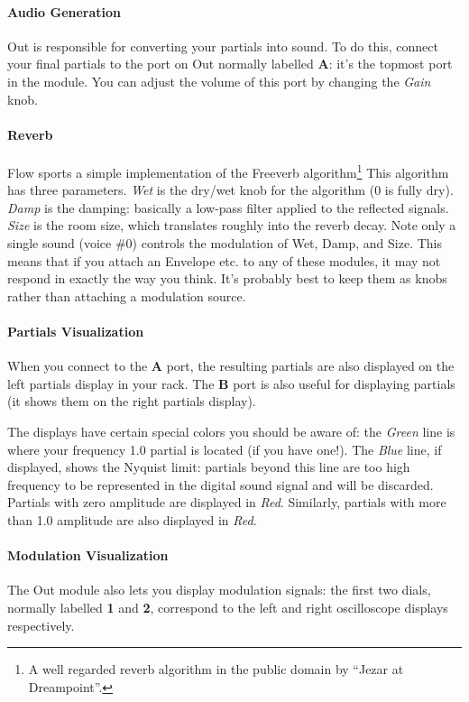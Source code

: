 \documentclass{article}
\begin{document}
\paragraph{Audio Generation}  Out is responsible for converting your partials into sound.  To do this, connect your final partials to the port on Out normally labelled {\bf A}: it's the topmost port in the module.  You can adjust the volume of this port by changing the {\it Gain} knob.

\paragraph{Reverb} Flow sports a simple implementation of the Freeverb algorithm\footnote{A well regarded reverb algorithm in the public domain by ``Jezar at Dreampoint''.}  This algorithm has three parameters.  {\it Wet} is the dry/wet knob for the algorithm (0 is fully dry).  {\it Damp} is the damping: basically a low-pass filter applied to the reflected signals.  {\it Size} is the room size, which translates roughly into the reverb decay.  Note only a single sound (voice \#0) controls the modulation of Wet, Damp, and Size.  This means that if you attach an Envelope etc. to any of these modules, it may not respond in exactly the way you think.  It's probably best to keep them as knobs rather than attaching a modulation source.

\paragraph{Partials Visualization}  When you connect to the {\bf A} port, the resulting partials are also displayed on the left partials display in your rack.  The {\bf B} port is also useful for displaying partials (it shows them on the right partials display).  

The displays have certain special colors you should be aware of: the {\it Green} line is where your frequency 1.0 partial is located (if you have one!).  The {\it Blue} line, if displayed, shows the Nyquist limit: partials beyond this line are too high frequency to be represented in the digital sound signal and will be discarded.  Partials with zero amplitude are displayed in {\it Red}.  Similarly, partials with more than 1.0 amplitude are also displayed in {\it Red}.

\paragraph{Modulation Visualization} The Out module also lets you display modulation signals: the first two dials, normally labelled {\bf 1} and {\bf 2}, correspond to the left and right oscilloscope displays respectively.
\end{document}

